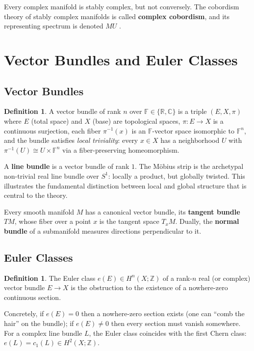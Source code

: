 \documentclass[12pt]{article}
\theoremstyle{definition}
\newtheorem{definition}[theorem]{Definition}
\theoremstyle{remark}
\newcommand{\R}{\mathbb{R}}
\newcommand{\C}{\mathbb{C}}
\newcommand{\Z}{\mathbb{Z}}
\begin{document}
Every complex manifold is stably complex, but not conversely. The cobordism theory of stably complex manifolds is called \textbf{complex cobordism}, and its representing spectrum is denoted $MU$ \cite{WC25}.

\section{Vector Bundles and Euler Classes}\label{sec:bundles}

\subsection{Vector Bundles}

\begin{definition}
A vector bundle of rank $n$ over $\mathbb{F} \in \{\R, \C\}$ is a triple $(E, X, \pi)$ where $E$ (total space) and $X$ (base) are topological spaces, $\pi : E \to X$ is a continuous surjection, each fiber $\pi^{-1}(x)$ is an $\mathbb{F}$-vector space isomorphic to $\mathbb{F}^n$, and the bundle satisfies \emph{local triviality}: every $x \in X$ has a neighborhood $U$ with $\pi^{-1}(U) \cong U \times \mathbb{F}^n$ via a fiber-preserving homeomorphism.
\end{definition}

A \textbf{line bundle} is a vector bundle of rank $1$. The M\"obius strip is the archetypal non-trivial real line bundle over $S^1$: locally a product, but globally twisted. This illustrates the fundamental distinction between local and global structure that is central to the theory.

Every smooth manifold $M$ has a canonical vector bundle, its \textbf{tangent bundle} $TM$, whose fiber over a point $x$ is the tangent space $T_x M$. Dually, the \textbf{normal bundle} of a submanifold measures directions perpendicular to it.

\subsection{Euler Classes}

\begin{definition}
The Euler class $e(E) \in H^n(X; \Z)$ of a rank-$n$ real (or complex) vector bundle $E \to X$ is the obstruction to the existence of a nowhere-zero continuous section.
\end{definition}

Concretely, if $e(E) = 0$ then a nowhere-zero section exists (one can ``comb the hair'' on the bundle); if $e(E) \neq 0$ then every section must vanish somewhere. For a complex line bundle $L$, the Euler class coincides with the first Chern class: $e(L) = c_1(L) \in H^2(X; \Z)$.
\end{document}
